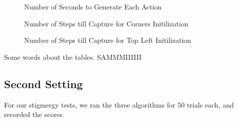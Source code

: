 \documentclass[11pt]{article}
\begin{document}
\begin{figure}[H]
	\caption{Number of Seconds to Generate Each Action}
\end{figure}


\begin{figure}[H]
	\caption{Number of Steps till Capture for Corners Initilization}
\end{figure}

\begin{figure}[H]
	\caption{Number of Steps till Capture for Top Left Initilization}
\end{figure}


\begin{multicols}{2}

Some words about the tables. SAMMMIIIIII

\subsection{Second Setting}
For our stigmergy tests, we ran the three algorithms for 50 trials each, and recorded the scores.  
\end{multicols}
\end{document}
